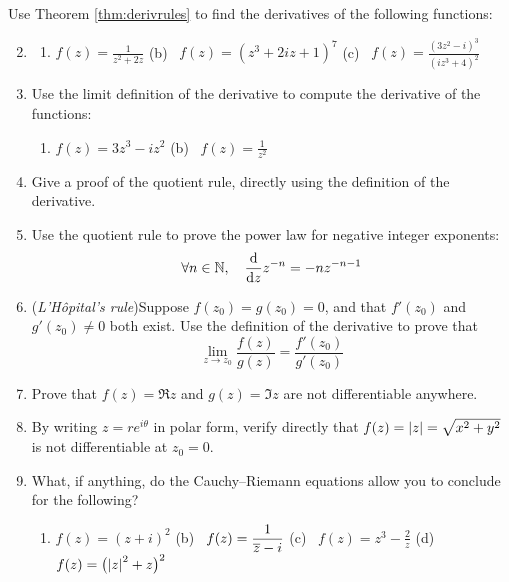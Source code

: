 \goodbreak


\begin{exercises}{}
	\exstart Use Theorem \ref{thm:derivrules} to find the derivatives of the following functions:
	\begin{enumerate}\setcounter{enumi}{1}
	  \item[]\begin{enumerate}
	  	\item $\displaystyle f(z)=\frac 1{z^2+2z}$\qquad
	    (b) \ $\displaystyle f(z)=(z^3+2iz+1)^7$\qquad
	    (c) \ $\displaystyle f(z)=\frac{(3z^2-i)^3}{(iz^3+4)^2}$
	  \end{enumerate}
	  
	  
	  \item Use the limit definition of the derivative to compute the derivative of the functions:
	  \begin{enumerate}
	  	\item $\displaystyle f(z)=3z^3-iz^2$\qquad
	    (b) \ $\displaystyle f(z)=\frac 1{z^2}$
	  \end{enumerate}
	  
	  
	  \item Give a proof of the quotient rule, directly using the definition of the derivative.
	  
	  
	  \item Use the quotient rule to prove the power law for negative integer exponents:
	  \[
	  	\forall n\in\mathbb{N},\quad \frac{\mathrm{d} }{\mathrm{d} z}z^{-n}=-nz^{-n-1}
	  \]
	  
	  
	  \item (\emph{L'Hôpital's rule})\lstsp Suppose $f(z_0)=g(z_0)=0$, and that $f'(z_0)$ and $g'(z_0)\neq 0$ both exist. Use the definition of the derivative to prove that
	  \[
	  	\lim_{z\to z_0}\frac{f(z)}{g(z)}=\frac{f'(z_0)}{g'(z_0)}
	  \]
	  
	  
	  \item Prove that $f(z)=\Re z$ and $g(z)=\Im z$ are not differentiable anywhere.
	  
	  
	  \item By writing $z=re^{i\theta}$ in polar form, verify directly that $f(z)=\left| z\right|=\sqrt{x^2+y^2}$ is not differentiable at $z_0=0$.
	  
	  
	  \item What, if anything, do the Cauchy--Riemann equations allow you to conclude for the following?
	  \begin{enumerate}
	  	\item $\displaystyle f(z)=(z+i)^2$\qquad 
	  	(b) \ $\displaystyle f(z)= \frac{1}{\overline{z}-i}$\qquad
	    (c) \ $\displaystyle f(z)=z^3-\frac 2z$\qquad
	    (d) \ $\displaystyle f(z)=\bigl(\left| z\right|^2+z\bigr)^2$
	  \end{enumerate}
	  

\end{enumerate}
\end{exercises}
